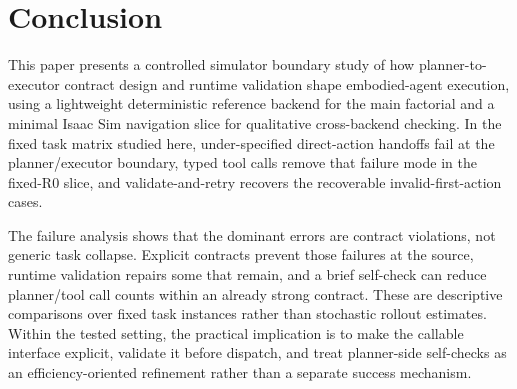 \section{Conclusion}

This paper presents a controlled simulator boundary study of how
planner-to-executor contract design and runtime validation shape
embodied-agent execution, using a lightweight deterministic reference backend
for the main factorial and a minimal Isaac Sim navigation slice for
qualitative cross-backend checking.
In the fixed task matrix studied here, under-specified direct-action handoffs
fail at the planner/executor boundary, typed tool calls remove that failure
mode in the fixed-R0 slice, and validate-and-retry recovers the recoverable
invalid-first-action cases.

The failure analysis shows that the dominant errors are contract violations,
not generic task collapse. Explicit contracts prevent those failures at
the source, runtime validation repairs some that remain, and a brief
self-check can reduce planner/tool call counts within an already strong contract.
These are descriptive comparisons over fixed task instances rather than
stochastic rollout estimates. Within the tested setting, the practical implication is to make the callable
interface explicit, validate it before dispatch, and treat planner-side
self-checks as an efficiency-oriented refinement rather than a separate
success mechanism.
